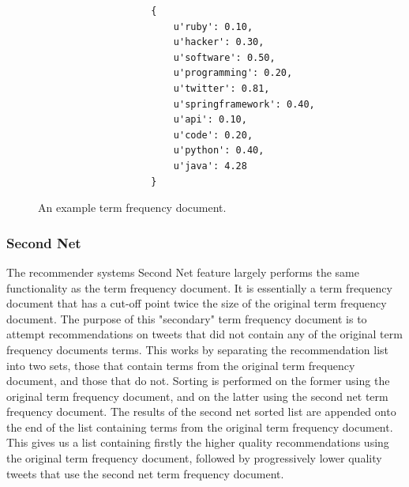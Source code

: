 \documentclass{article}
\begin{document}
\begin{figure}[H]
\centering
\begin{verbatim}
                    {
                        u'ruby': 0.10, 
                        u'hacker': 0.30, 
                        u'software': 0.50, 
                        u'programming': 0.20, 
                        u'twitter': 0.81, 
                        u'springframework': 0.40, 
                        u'api': 0.10, 
                        u'code': 0.20, 
                        u'python': 0.40, 
                        u'java': 4.28
                    }
\end{verbatim}
\caption{An example term frequency document.}
\end{figure}


\subsubsection*{Second Net} 

The recommender systems Second Net feature largely performs the same functionality as the term frequency document. It is essentially a term frequency document that has a cut-off point twice the size of the original term frequency document. The purpose of this "secondary" term frequency document is to attempt recommendations on tweets that did not contain any of the original term frequency documents terms. This works by separating the recommendation list into two sets, those that contain terms from the original term frequency document, and those that do not. Sorting is performed on the former using the original term frequency document, and on the latter using the second net term frequency document. The results of the second net sorted list are appended onto the end of the list containing terms from the original term frequency document. This gives us a list containing firstly the higher quality recommendations using the original term frequency document, followed by progressively lower quality tweets that use the second net term frequency document.
\end{document}
